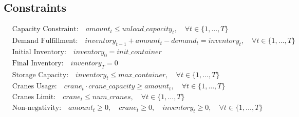\documentclass{article}
\begin{document}
\subsection*{Constraints}
\begin{align}
    & \text{Capacity Constraint:} \quad amount_{t} \leq unload\_capacity_{t}, \quad \forall t \in \{1, \ldots, T\} \\
    & \text{Demand Fulfillment:} \quad inventory_{t-1} + amount_{t} - demand_{t} = inventory_{t}, \quad \forall t \in \{1, \ldots, T\} \\
    & \text{Initial Inventory:} \quad inventory_{0} = init\_container \\
    & \text{Final Inventory:} \quad inventory_{T} = 0 \\
    & \text{Storage Capacity:} \quad inventory_{t} \leq max\_container, \quad \forall t \in \{1, \ldots, T\} \\
    & \text{Cranes Usage:} \quad crane_{t} \cdot crane\_capacity \geq amount_{t}, \quad \forall t \in \{1, \ldots, T\} \\
    & \text{Cranes Limit:} \quad crane_{t} \leq num\_cranes, \quad \forall t \in \{1, \ldots, T\} \\
    & \text{Non-negativity:} \quad amount_{t} \geq 0, \quad crane_{t} \geq 0, \quad inventory_{t} \geq 0, \quad \forall t \in \{1, \ldots, T\}
\end{align}
\end{document}
